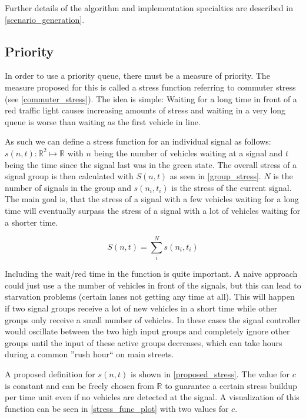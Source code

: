 Further details of the algorithm and implementation specialties are described in \autoref{scenario_generation}.

\subsection*{Priority}
\label{stress_prio}

In order to use a priority queue, there must be a measure of priority. The measure proposed for this is called a stress function referring to commuter stress (see \autoref{commuter_stress}). The idea is simple: Waiting for a long time in front of a red traffic light causes increasing amounts of stress and waiting in a very long queue is worse than waiting as the first vehicle in line.

As such we can define a stress function for an individual signal as follows: $s(n, t): \mathbb{R}^2 \mapsto \mathbb{R}$ with $n$ being the number of vehicles waiting at a signal and $t$ being the time since the signal last was in the green state. The overall stress of a signal group is then calculated with $S(n, t)$ as seen in \autoref{group_stress}. $N$ is the number of signals in the group and $s\left(n_i, t_i\right)$ is the stress of the current signal. The main goal is, that the stress of a signal with a few vehicles waiting for a long time will eventually surpass the stress of a signal with a lot of vehicles waiting for a shorter time. 

\begin{equation} \label{group_stress}
	S(n, t) = \sum_{i}^{N}{s\left(n_i, t_i\right)}
\end{equation}

Including the wait/red time in the function is quite important. A naive approach could just use a the number of vehicles in front of the signals, but this can lead to starvation problems (certain lanes not getting any time at all). This will happen if two signal groups receive a lot of new vehicles in a short time while other groups only receive a small number of vehicles. In these cases the signal controller would oscillate between the two high input groups and completely ignore other groups until the input of these active groups decreases, which can take hours during a common ''rush hour`` on main streets.

A proposed definition for $s(n, t) $ is shown in \autoref{proposed_stress}. The value for $c$ is constant and can be freely chosen from $\mathbb{R}$ to guarantee a certain stress buildup per time unit even if no vehicles are detected at the signal. A visualization of this function can be seen in \autoref{stress_func_plot} with two values for $c$.

